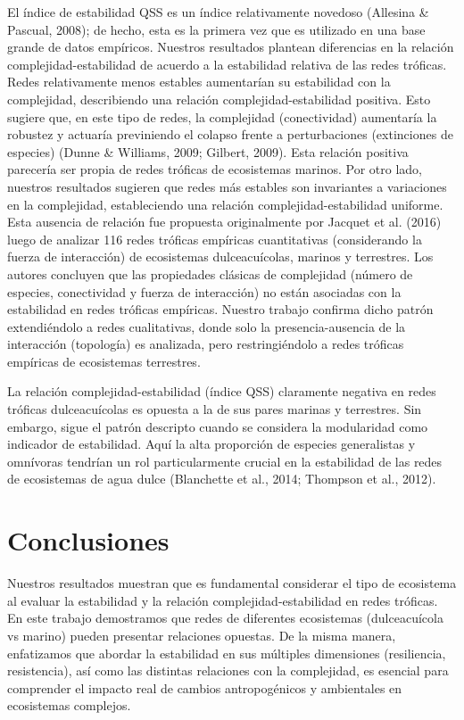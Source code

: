 \documentclass[
]{article}
\begin{document}
El índice de estabilidad QSS es un índice relativamente novedoso
(Allesina \& Pascual, 2008); de hecho, esta es la primera vez que es
utilizado en una base grande de datos empíricos. Nuestros resultados
plantean diferencias en la relación complejidad-estabilidad de acuerdo a
la estabilidad relativa de las redes tróficas. Redes relativamente menos
estables aumentarían su estabilidad con la complejidad, describiendo una
relación complejidad-estabilidad positiva. Esto sugiere que, en este
tipo de redes, la complejidad (conectividad) aumentaría la robustez y
actuaría previniendo el colapso frente a perturbaciones (extinciones de
especies) (Dunne \& Williams, 2009; Gilbert, 2009). Esta relación
positiva parecería ser propia de redes tróficas de ecosistemas marinos.
Por otro lado, nuestros resultados sugieren que redes más estables son
invariantes a variaciones en la complejidad, estableciendo una relación
complejidad-estabilidad uniforme. Esta ausencia de relación fue
propuesta originalmente por Jacquet et al. (2016) luego de analizar 116
redes tróficas empíricas cuantitativas (considerando la fuerza de
interacción) de ecosistemas dulceacuícolas, marinos y terrestres. Los
autores concluyen que las propiedades clásicas de complejidad (número de
especies, conectividad y fuerza de interacción) no están asociadas con
la estabilidad en redes tróficas empíricas. Nuestro trabajo confirma
dicho patrón extendiéndolo a redes cualitativas, donde solo la
presencia-ausencia de la interacción (topología) es analizada, pero
restringiéndolo a redes tróficas empíricas de ecosistemas terrestres.

La relación complejidad-estabilidad (índice QSS) claramente negativa en
redes tróficas dulceacuícolas es opuesta a la de sus pares marinas y
terrestres. Sin embargo, sigue el patrón descripto cuando se considera
la modularidad como indicador de estabilidad. Aquí la alta proporción de
especies generalistas y omnívoras tendrían un rol particularmente
crucial en la estabilidad de las redes de ecosistemas de agua dulce
(Blanchette et al., 2014; Thompson et al., 2012).

\hypertarget{conclusiones}{%
\section{Conclusiones}\label{conclusiones}}

Nuestros resultados muestran que es fundamental considerar el tipo de
ecosistema al evaluar la estabilidad y la relación
complejidad-estabilidad en redes tróficas. En este trabajo demostramos
que redes de diferentes ecosistemas (dulceacuícola vs marino) pueden
presentar relaciones opuestas. De la misma manera, enfatizamos que
abordar la estabilidad en sus múltiples dimensiones (resiliencia,
resistencia), así como las distintas relaciones con la complejidad, es
esencial para comprender el impacto real de cambios antropogénicos y
ambientales en ecosistemas complejos.
\end{document}
